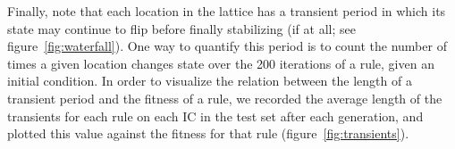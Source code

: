 
Finally, note that each location in the lattice has a transient period in which its state may continue to flip before finally stabilizing (if at all; see figure~\ref{fig:waterfall}). One way to quantify this period is to count the number of times a given location changes state 
over the 200 iterations of a rule, given an initial condition. In order to visualize the relation between the length of a transient period and the fitness of a rule, 
we recorded the average length of the transients for each rule on each IC in the test set after each generation, and plotted this value against the fitness 
for that rule (figure~\ref{fig:transients}).

